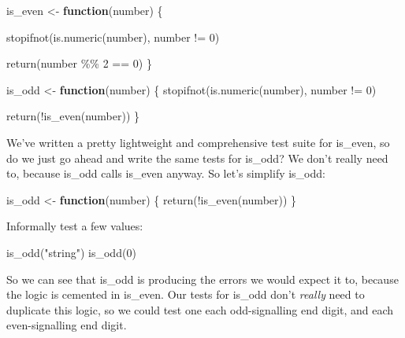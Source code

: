 \documentclass[
  letterpaper,
  DIV=11,
  numbers=noendperiod]{scrreprt}
\newenvironment{Shaded}{\begin{snugshade}}{\end{snugshade}}
\newcommand{\ControlFlowTok}[1]{\textcolor[rgb]{0.00,0.23,0.31}{\textbf{#1}}}
\newcommand{\DecValTok}[1]{\textcolor[rgb]{0.68,0.00,0.00}{#1}}
\newcommand{\FunctionTok}[1]{\textcolor[rgb]{0.28,0.35,0.67}{#1}}
\newcommand{\NormalTok}[1]{\textcolor[rgb]{0.00,0.23,0.31}{#1}}
\newcommand{\OtherTok}[1]{\textcolor[rgb]{0.00,0.23,0.31}{#1}}
\newcommand{\SpecialCharTok}[1]{\textcolor[rgb]{0.37,0.37,0.37}{#1}}
\newcommand{\StringTok}[1]{\textcolor[rgb]{0.13,0.47,0.30}{#1}}
\begin{document}
\begin{Shaded}
\begin{Highlighting}[]
\NormalTok{is\_even }\OtherTok{\textless{}{-}} \ControlFlowTok{function}\NormalTok{(number) \{}
  
  \FunctionTok{stopifnot}\NormalTok{(}\FunctionTok{is.numeric}\NormalTok{(number), number }\SpecialCharTok{!=} \DecValTok{0}\NormalTok{)}
  
  \FunctionTok{return}\NormalTok{(number }\SpecialCharTok{\%\%} \DecValTok{2} \SpecialCharTok{==} \DecValTok{0}\NormalTok{)}
\NormalTok{\}}

\NormalTok{is\_odd }\OtherTok{\textless{}{-}} \ControlFlowTok{function}\NormalTok{(number) \{}
  \FunctionTok{stopifnot}\NormalTok{(}\FunctionTok{is.numeric}\NormalTok{(number), number }\SpecialCharTok{!=} \DecValTok{0}\NormalTok{)}
  
  \FunctionTok{return}\NormalTok{(}\SpecialCharTok{!}\FunctionTok{is\_even}\NormalTok{(number))}
\NormalTok{\}}
\end{Highlighting}
\end{Shaded}

We've written a pretty lightweight and comprehensive test suite for
is\_even, so do we just go ahead and write the same tests for is\_odd?
We don't really need to, because is\_odd calls is\_even anyway. So let's
simplify is\_odd:

\begin{Shaded}
\begin{Highlighting}[]
\NormalTok{is\_odd }\OtherTok{\textless{}{-}} \ControlFlowTok{function}\NormalTok{(number) \{}
  \FunctionTok{return}\NormalTok{(}\SpecialCharTok{!}\FunctionTok{is\_even}\NormalTok{(number))}
\NormalTok{\}}
\end{Highlighting}
\end{Shaded}

Informally test a few values:

\begin{Shaded}
\begin{Highlighting}[]
\FunctionTok{is\_odd}\NormalTok{(}\StringTok{"string"}\NormalTok{)}
\FunctionTok{is\_odd}\NormalTok{(}\DecValTok{0}\NormalTok{)}
\end{Highlighting}
\end{Shaded}

So we can see that is\_odd is producing the errors we would expect it
to, because the logic is cemented in is\_even. Our tests for is\_odd
don't \emph{really} need to duplicate this logic, so we could test one
each odd-signalling end digit, and each even-signalling end digit.
\end{document}
